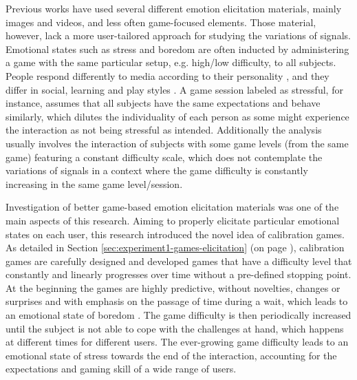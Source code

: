 
Previous works have used several different emotion elicitation materials, mainly images and videos, and less often game-focused elements. Those material, however, lack a more user-tailored approach for studying the variations of signals. Emotional states such as stress and boredom are often inducted by administering a game with the same particular setup, e.g. high/low difficulty, to all subjects. People respond differently to media according to their personality \cite{ravaja2004effects}, and they differ in social, learning and play styles \cite{goldberg1993structure}. A game session labeled as stressful, for instance, assumes that all subjects have the same expectations and behave similarly, which dilutes the individuality of each person as some might experience the interaction as not being stressful as intended. Additionally the analysis usually involves the interaction of subjects with some game levels (from the same game) featuring a constant difficulty scale, which does not contemplate the variations of signals in a context where the game difficulty is constantly increasing in the same game level/session.

Investigation of better game-based emotion elicitation materials was one of the main aspects of this research. Aiming to properly elicitate particular emotional states on each user, this research introduced the novel idea of calibration games. As detailed in Section \ref{sec:experiment1-games-elicitation} (on page \pageref{sec:experiment1-games-elicitation}), calibration games are carefully designed and developed games that have a difficulty level that constantly and linearly progresses over time without a pre-defined stopping point. At the beginning the games are highly predictive, without novelties, changes or surprises and with emphasis on the passage of time during a wait, which leads to an emotional state of boredom \cite{van2010behave,koster2013theory,schell2014art}. The game difficulty is then periodically increased until the subject is not able to cope with the challenges at hand, which happens at different times for different users. The ever-growing game difficulty leads to an emotional state of stress towards the end of the interaction, accounting for the expectations and gaming skill of a wide range of users.

